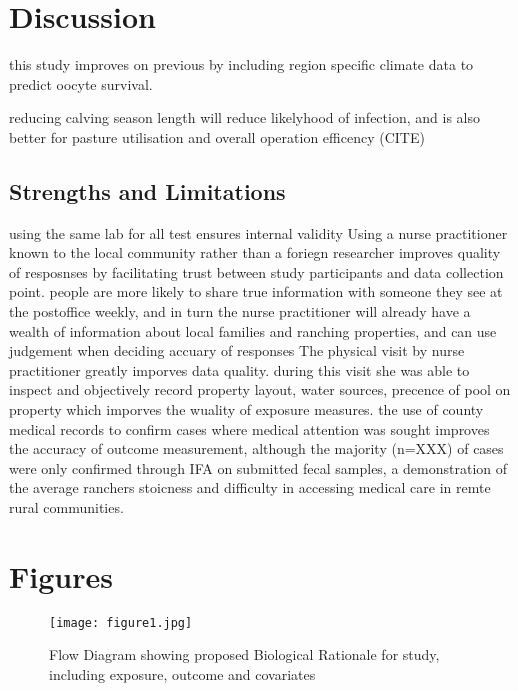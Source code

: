 \documentclass[12pt]{article}
\begin{document}
	\section{Discussion} 

		this study improves on previous by including region specific climate data \cite{CIMIS} to predict oocyte survival. 

		reducing calving season length will reduce likelyhood of infection, and is also better for pasture utilisation and overall operation efficency (CITE)	

	\subsection{Strengths and Limitations}
		

		using the same lab for all test ensures internal validity
		Using a nurse practitioner known to the local community rather than a foriegn researcher improves quality of resposnses by facilitating trust between study participants and data collection point. people are more likely to share true information with someone they see at the postoffice weekly, and in turn the nurse practitioner will already have a wealth of information about local families and ranching properties, and can use judgement when deciding accuary of responses
		The physical visit by nurse practitioner greatly imporves data quality. during this visit she was able to inspect and objectively record property layout, water sources, precence of pool on property which imporves the wuality of exposure measures.
		the use of county medical records to confirm cases where medical attention was sought improves the accuracy of outcome measurement, although the majority (n=XXX) of cases were only confirmed through IFA on submitted fecal samples, a demonstration of the average ranchers stoicness and difficulty in accessing medical care in remte rural communities. 

		\flushpage
		
	\section{Figures}

\begin{figure*}[h!]
	\centering
	\texttt{[image: figure1.jpg]}
	\caption{Flow Diagram showing proposed Biological Rationale for study, including exposure, outcome and covariates }
	\label{fig:1}
\end{figure*}
\end{document}
